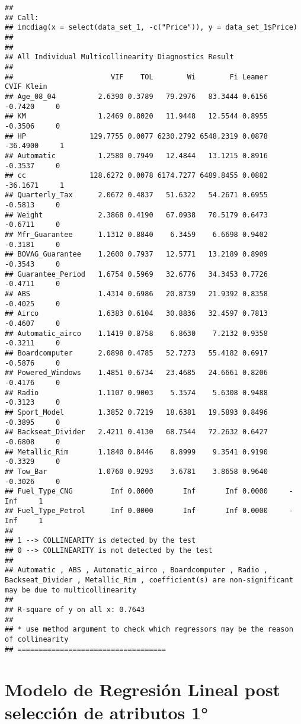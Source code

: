 \documentclass[]{article}
\begin{document}
\begin{verbatim}
## 
## Call:
## imcdiag(x = select(data_set_1, -c("Price")), y = data_set_1$Price)
## 
## 
## All Individual Multicollinearity Diagnostics Result
## 
##                       VIF    TOL        Wi        Fi Leamer     CVIF Klein
## Age_08_04          2.6390 0.3789   79.2976   83.3444 0.6156  -0.7420     0
## KM                 1.2469 0.8020   11.9448   12.5544 0.8955  -0.3506     0
## HP               129.7755 0.0077 6230.2792 6548.2319 0.0878 -36.4900     1
## Automatic          1.2580 0.7949   12.4844   13.1215 0.8916  -0.3537     0
## cc               128.6272 0.0078 6174.7277 6489.8455 0.0882 -36.1671     1
## Quarterly_Tax      2.0672 0.4837   51.6322   54.2671 0.6955  -0.5813     0
## Weight             2.3868 0.4190   67.0938   70.5179 0.6473  -0.6711     0
## Mfr_Guarantee      1.1312 0.8840    6.3459    6.6698 0.9402  -0.3181     0
## BOVAG_Guarantee    1.2600 0.7937   12.5771   13.2189 0.8909  -0.3543     0
## Guarantee_Period   1.6754 0.5969   32.6776   34.3453 0.7726  -0.4711     0
## ABS                1.4314 0.6986   20.8739   21.9392 0.8358  -0.4025     0
## Airco              1.6383 0.6104   30.8836   32.4597 0.7813  -0.4607     0
## Automatic_airco    1.1419 0.8758    6.8630    7.2132 0.9358  -0.3211     0
## Boardcomputer      2.0898 0.4785   52.7273   55.4182 0.6917  -0.5876     0
## Powered_Windows    1.4851 0.6734   23.4685   24.6661 0.8206  -0.4176     0
## Radio              1.1107 0.9003    5.3574    5.6308 0.9488  -0.3123     0
## Sport_Model        1.3852 0.7219   18.6381   19.5893 0.8496  -0.3895     0
## Backseat_Divider   2.4211 0.4130   68.7544   72.2632 0.6427  -0.6808     0
## Metallic_Rim       1.1840 0.8446    8.8999    9.3541 0.9190  -0.3329     0
## Tow_Bar            1.0760 0.9293    3.6781    3.8658 0.9640  -0.3026     0
## Fuel_Type_CNG         Inf 0.0000       Inf       Inf 0.0000     -Inf     1
## Fuel_Type_Petrol      Inf 0.0000       Inf       Inf 0.0000     -Inf     1
## 
## 1 --> COLLINEARITY is detected by the test 
## 0 --> COLLINEARITY is not detected by the test
## 
## Automatic , ABS , Automatic_airco , Boardcomputer , Radio , Backseat_Divider , Metallic_Rim , coefficient(s) are non-significant may be due to multicollinearity
## 
## R-square of y on all x: 0.7643 
## 
## * use method argument to check which regressors may be the reason of collinearity
## ===================================
\end{verbatim}

\hypertarget{modelo-de-regresion-lineal-post-seleccion-de-atributos-1}{%
\section{Modelo de Regresión Lineal post selección de atributos
1°}\label{modelo-de-regresion-lineal-post-seleccion-de-atributos-1}}
\end{document}
